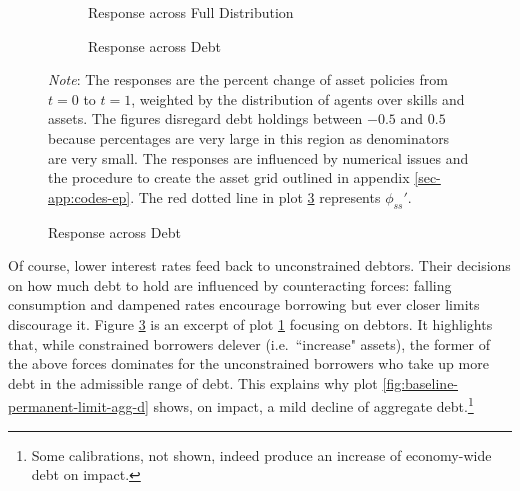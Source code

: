 \documentclass[a4paper,12pt]{article} %
\numberwithin{equation}{section} %
\numberwithin{figure}{section}
\numberwithin{table}{section}
\begin{document}
\begin{figure}[t]
    \caption{Baseline Model -- Shock to Borrowing Limit: \\ Asset Response across Asset Distribution}
    \label{fig:baseline-permanent-limit-dist-a-response}
    \centering
    \begin{subfigure}[b]{0.49\textwidth}
    \caption{Response across Full Distribution}
    \label{fig:baseline-permanent-limit-dist-a-response-all}
         \centering
         
     \end{subfigure}
     \hfill
     \begin{subfigure}[b]{0.49\textwidth}
     \caption{Response across Debt}
     \label{fig:baseline-permanent-limit-dist-a-response-debt}
         \centering
         
     \end{subfigure}

    \vspace{5pt}
     
     \justifying
     \footnotesize
	\textit{Note}: The responses are the percent change of asset policies from $t=0$ to $t=1$, weighted by the distribution of agents over skills and assets. The figures disregard debt holdings between $-0.5$ and $0.5$ because percentages are very large in this region as denominators are very small. The responses are influenced by numerical issues and the procedure to create the asset grid outlined in appendix \ref{sec-app:codes-ep}. The red dotted line in plot \ref{fig:baseline-permanent-limit-dist-a-response-debt} represents $\phi_{ss}'$.
\end{figure}

Of course, lower interest rates feed back to unconstrained debtors. Their decisions on how much debt to hold are influenced by counteracting forces: falling consumption and dampened rates encourage borrowing but ever closer limits discourage it. Figure \ref{fig:baseline-permanent-limit-dist-a-response-debt} is an excerpt of plot \ref{fig:baseline-permanent-limit-dist-a-response-all} focusing on debtors. It highlights that, while constrained borrowers delever (i.e.~``increase" assets), the former of the above forces dominates for the unconstrained borrowers who take up more debt in the admissible range of debt. This explains why plot \ref{fig:baseline-permanent-limit-agg-d} shows, on impact, a mild decline of aggregate debt.\footnote{Some calibrations, not shown, indeed produce an increase of economy-wide debt on impact.}
\end{document}
